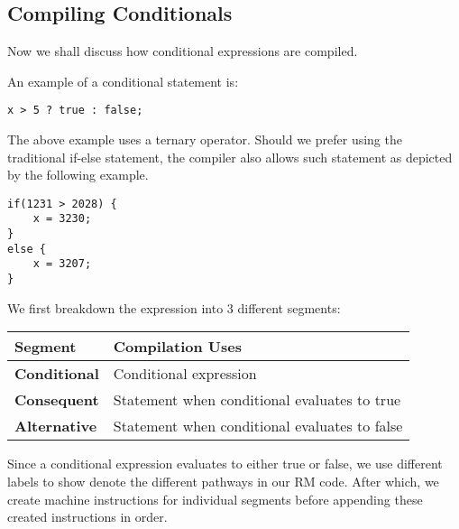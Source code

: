 \subsection{Compiling Conditionals}
Now we shall discuss how conditional expressions are compiled.\newline

An example of a conditional statement is:
\begin{lstlisting}[caption=Example of Conditionals (Ternary Operator)]
x > 5 ? true : false;
\end{lstlisting}

The above example uses a ternary operator. Should we prefer using the traditional if-else statement, the compiler also allows such statement as depicted by the following example.\begin{lstlisting}[caption=Example of Conditionals (If-Else Statements)]
if(1231 > 2028) {
	x = 3230;
}
else {
	x = 3207;
}
\end{lstlisting}

We first breakdown the expression into 3 different segments:

\begin{center}
\begin{tabular}{|l|l|} \hline 
Segment & Compilation Uses \\ \hline
\textbf{Conditional} & Conditional expression\\
\textbf{Consequent}  & Statement when conditional evaluates to true \\ 
\textbf{Alternative}  & Statement when conditional evaluates to false \\ \hline
\end{tabular}
\end{center}

Since a conditional expression evaluates to either true or false, we use different labels to show denote the different pathways in our RM code. After which, we create machine instructions for individual segments before appending these created instructions in order.

